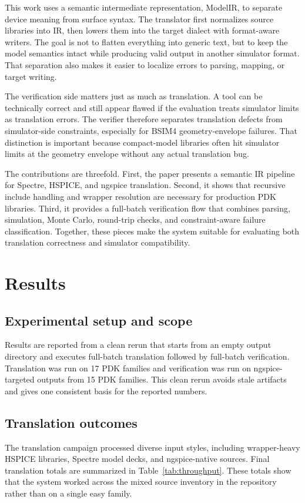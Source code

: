 \documentclass[10pt,twocolumn,a4paper]{article}
\begin{document}
This work uses a semantic intermediate representation, ModelIR, to separate device meaning from surface syntax. The translator first normalizes source libraries into IR, then lowers them into the target dialect with format-aware writers. The goal is not to flatten everything into generic text, but to keep the model semantics intact while producing valid output in another simulator format. That separation also makes it easier to localize errors to parsing, mapping, or target writing.

The verification side matters just as much as translation. A tool can be technically correct and still appear flawed if the evaluation treats simulator limits as translation errors. The verifier therefore separates translation defects from simulator-side constraints, especially for BSIM4 geometry-envelope failures. That distinction is important because compact-model libraries often hit simulator limits at the geometry envelope without any actual translation bug.

The contributions are threefold. First, the paper presents a semantic IR pipeline for Spectre, HSPICE, and ngspice translation. Second, it shows that recursive include handling and wrapper resolution are necessary for production PDK libraries. Third, it provides a full-batch verification flow that combines parsing, simulation, Monte Carlo, round-trip checks, and constraint-aware failure classification. Together, these pieces make the system suitable for evaluating both translation correctness and simulator compatibility.

\section{Results}

\subsection{Experimental setup and scope}
Results are reported from a clean rerun that starts from an empty output directory and executes full-batch translation followed by full-batch verification. Translation was run on 17 PDK families and verification was run on ngspice-targeted outputs from 15 PDK families. This clean rerun avoids stale artifacts and gives one consistent basis for the reported numbers.

\subsection{Translation outcomes}
The translation campaign processed diverse input styles, including wrapper-heavy HSPICE libraries, Spectre model decks, and ngspice-native sources. Final translation totals are summarized in Table~\ref{tab:throughput}. These totals show that the system worked across the mixed source inventory in the repository rather than on a single easy family.
\end{document}
